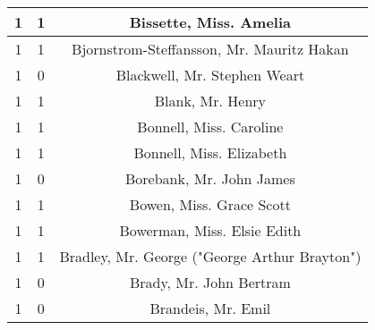 \begin{tabular}{|c|c|c|}
	\hline
	1 & 1 & Bissette, Miss. Amelia \\
	\hline
	1 & 1 & Bjornstrom-Steffansson, Mr. Mauritz Hakan \\
	\hline
	1 & 0 & Blackwell, Mr. Stephen Weart \\
	\hline
	1 & 1 & Blank, Mr. Henry \\
	\hline
	1 & 1 & Bonnell, Miss. Caroline \\
	\hline
	1 & 1 & Bonnell, Miss. Elizabeth \\
	\hline
	1 & 0 & Borebank, Mr. John James \\
	\hline
	1 & 1 & Bowen, Miss. Grace Scott \\
	\hline
	1 & 1 & Bowerman, Miss. Elsie Edith \\
	\hline
	1 & 1 & Bradley, Mr. George ("George Arthur Brayton") \\
	\hline
	1 & 0 & Brady, Mr. John Bertram \\
	\hline
	1 & 0 & Brandeis, Mr. Emil \\
	\hline
\end{tabular}